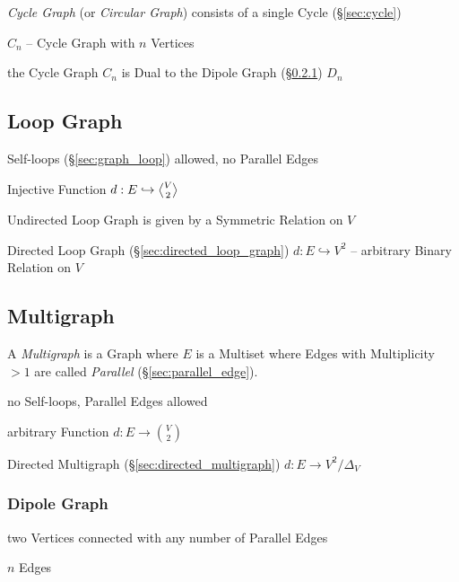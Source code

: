\emph{Cycle Graph} (or \emph{Circular Graph}) consists of a single
Cycle (\S\ref{sec:cycle})

$C_n$ -- Cycle Graph with $n$ Vertices

the Cycle Graph $C_n$ is Dual to the Dipole Graph
(\S\ref{sec:dipole_graph}) $D_n$



\subsection{Loop Graph}\label{sec:loop_graph}

Self-loops (\S\ref{sec:graph_loop}) allowed, no Parallel Edges

Injective Function $d : E \hookrightarrow \angleover{V}{2}$

Undirected Loop Graph is given by a Symmetric Relation on $V$

Directed Loop Graph (\S\ref{sec:directed_loop_graph}) $d : E
\hookrightarrow V^2$ -- arbitrary Binary Relation on $V$



\subsection{Multigraph}\label{sec:multigraph}

A \emph{Multigraph} is a Graph where $E$ is a Multiset where Edges
with Multiplicity $>1$ are called \emph{Parallel}
(\S\ref{sec:parallel_edge}).

no Self-loops, Parallel Edges allowed

arbitrary Function $d : E \rightarrow {V \choose 2}$

Directed Multigraph (\S\ref{sec:directed_multigraph}) $d : E
\rightarrow V^2 / \Delta_V$



\subsubsection{Dipole Graph}\label{sec:dipole_graph}

two Vertices connected with any number of Parallel Edges

$n$ Edges

